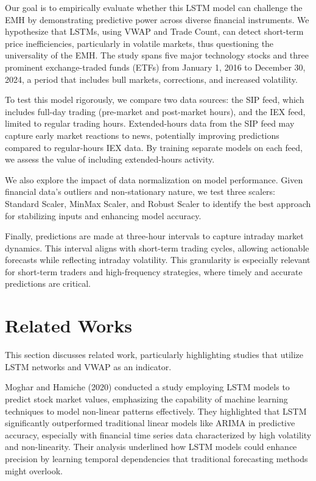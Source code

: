 \documentclass[10pt,a4paper]{article}
\begin{document}
Our goal is to empirically evaluate whether this LSTM model can challenge the EMH by demonstrating predictive power across diverse financial instruments. We hypothesize that LSTMs, using VWAP and Trade Count, can detect short-term price inefficiencies, particularly in volatile markets, thus questioning the universality of the EMH. The study spans five major technology stocks and three prominent exchange-traded funds (ETFs) from January 1, 2016 to December 30, 2024, a period that includes bull markets, corrections, and increased volatility.

To test this model rigorously, we compare two data sources: the SIP feed, which includes full-day trading (pre-market and post-market hours), and the IEX feed, limited to regular trading hours. Extended-hours data from the SIP feed may capture early market reactions to news, potentially improving predictions compared to regular-hours IEX data. By training separate models on each feed, we assess the value of including extended-hours activity.

We also explore the impact of data normalization on model performance. Given financial data’s outliers and non-stationary nature, we test three scalers: Standard Scaler, MinMax Scaler, and Robust Scaler to identify the best approach for stabilizing inputs and enhancing model accuracy.

Finally, predictions are made at three-hour intervals to capture intraday market dynamics. This interval aligns with short-term trading cycles, allowing actionable forecasts while reflecting intraday volatility. This granularity is especially relevant for short-term traders and high-frequency strategies, where timely and accurate predictions are critical.


\section{Related Works}

This section discusses related work, particularly highlighting studies that utilize LSTM networks and VWAP as an indicator.

Moghar and Hamiche (2020) \cite{moghar2020stock} conducted a study employing LSTM models to predict stock market values, emphasizing the capability of machine learning techniques to model non-linear patterns effectively. They highlighted that LSTM significantly outperformed traditional linear models like ARIMA in predictive accuracy, especially with financial time series data characterized by high volatility and non-linearity. Their analysis underlined how LSTM models could enhance precision by learning temporal dependencies that traditional forecasting methods might overlook.
\end{document}
